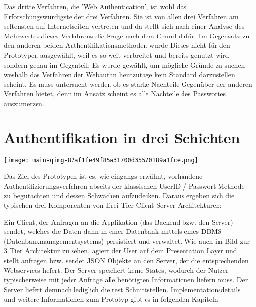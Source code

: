 Das dritte Verfahren, die 'Web Authentication', ist wohl das Erforschungswürdigste der drei Verfahren. Sie ist von allen drei Verfahren am seltensten auf Internetseiten vertreten und da stellt sich nach einer Analyse des Mehrwertes dieses Verfahrens die Frage nach dem Grund dafür. Im Gegensatz zu den anderen beiden Authentifikationsmethoden wurde Dieses nicht für den Prototypen ausgewählt, weil es so weit verbreitet und bereits genutzt wird sondern genau im Gegenteil: Es wurde gewählt, um mögliche Gründe zu suchen weshalb das Verfahren der Webauthn heutzutage kein Standard darzustellen scheint. Es muss untersucht werden ob es starke Nachteile Gegenüber der anderen Verfahren bietet, denn im Ansatz scheint es alle Nachteile des Passwortes auszumerzen.
\newpage

\section{Authentifikation in drei Schichten}

\begin{center}
    \center
    \texttt{[image: main-qimg-82af1fe49f85a31700d35570189a1fce.png]}
\end{center} 

Das Ziel des Prototypen ist es, wie eingangs erwähnt, vorhandene Authentifizierungsverfahren abseits der klassischen UserID / Passwort Methode zu begutachten und dessen Schwächen aufzudecken. Daraus ergeben sich die typischen drei Komponenten von Drei-Tier-Client-Server Architekturen:

Ein Client, der Anfragen an die Applikation (das Backend bzw. den Server) sendet, welches die Daten dann in einer Datenbank mittels eines DBMS (Datenbankmanagementsystems) persistiert und verwaltet. Wie auch im Bild zur 3 Tier Architektur zu sehen, agiert der User auf dem Presentation Layer und stellt anfragen bzw. sendet JSON Objekte an den Server, der die entsprechenden Webservices liefert. Der Server speichert keine States, wodurch der Nutzer typischerweise mit jeder Anfrage alle benötigten Informationen liefern muss. Der Server liefert demnach lediglich die \ac{rest} Schnittstellen. Implementationsdetails und weitere Informationen zum Prototyp gibt es in folgenden Kapiteln.

